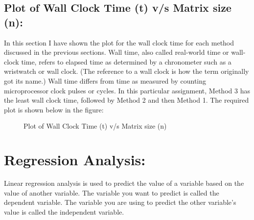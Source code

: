 \documentclass[12pt,a4paper]{article}
\begin{document}
\subsection{Plot of Wall Clock Time (t) v/s Matrix size (n):}
In this section I have shown the plot for the wall clock time for each method discussed in the previous sections. Wall time, also called real-world time or wall-clock time, refers to elapsed time as determined by a chronometer such as a wristwatch or wall clock. (The reference to a wall clock is how the term originally got its name.) Wall time differs from time as measured by counting microprocessor clock pulses or cycles. In this particular assignment, Method 3 has the least wall clock time, followed by Method 2 and then Method 1. The required plot is shown below in the figure:
\begin{figure}[!ht]
	\begin{center}
	\end{center}
	\caption{Plot of Wall Clock Time (t) v/s Matrix size (n)}
\end{figure}
\section{Regression Analysis:}
Linear regression analysis is used to predict the value of a variable based on the value of another variable. The variable you want to predict is called the dependent variable. The variable you are using to predict the other variable's value is called the independent variable.
\end{document}
